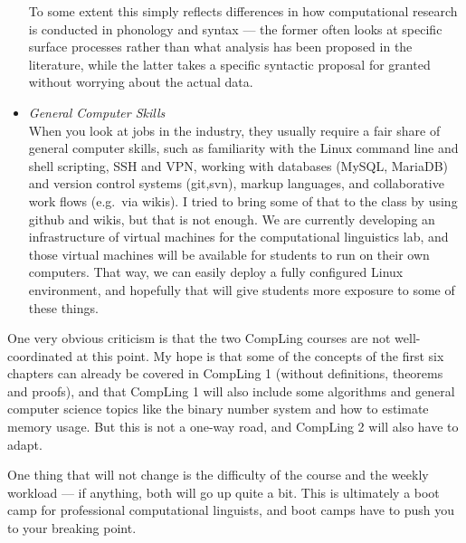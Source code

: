 \begin{itemize}
        To some extent this simply reflects differences in how computational research is conducted in phonology and syntax --- the former often looks at specific surface processes rather than what analysis has been proposed in the literature, while the latter takes a specific syntactic proposal for granted without worrying about the actual data.
    \item \emph{General Computer Skills}\\
        When you look at jobs in the industry, they usually require a fair share of general computer skills, such as familiarity with the Linux command line and shell scripting, SSH and VPN, working with databases (MySQL, MariaDB) and version control systems (git,svn), markup languages, and collaborative work flows (e.g.\ via wikis).
        I tried to bring some of that to the class by using github and wikis, but that is not enough.
        We are currently developing an infrastructure of virtual machines for the computational linguistics lab, and those virtual machines will be available for students to run on their own computers.
        That way, we can easily deploy a fully configured Linux environment, and hopefully that will give students more exposure to some of these things.
\end{itemize}

One very obvious criticism is that the two CompLing courses are not well-coordinated at this point.
My hope is that some of the concepts of the first six chapters can already be covered in CompLing 1 (without definitions, theorems and proofs), and that CompLing 1 will also include some algorithms and general computer science topics like the binary number system and how to estimate memory usage.
But this is not a one-way road, and CompLing 2 will also have to adapt.

One thing that will not change is the difficulty of the course and the weekly workload --- if anything, both will go up quite a bit.
This is ultimately a boot camp for professional computational linguists, and boot camps have to push you to your breaking point.
